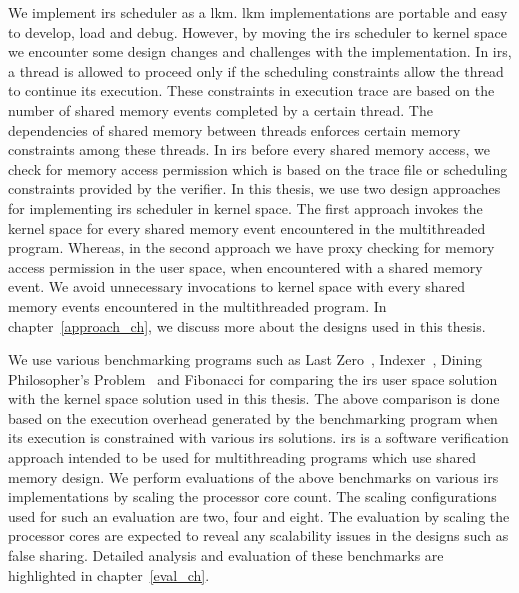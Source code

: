 We implement \acrshort{irs} scheduler as a \acrfull{lkm}. 
\acrshort{lkm} implementations are portable and easy to develop, load and debug. 
However, by moving the \acrshort{irs} scheduler to kernel space we encounter some design changes and challenges with the implementation. 
In \acrshort{irs}, a thread is allowed to proceed only if the scheduling constraints allow the thread to continue its execution. 
These constraints in execution trace are based on the number of shared memory events completed by a certain thread. 
The dependencies of shared memory between threads enforces certain memory constraints among these threads. 
In \acrshort{irs} before every shared memory access, we check for memory access permission which is based on the trace file or scheduling constraints provided by the verifier. 
In this thesis, we use two design approaches for implementing \acrshort{irs} scheduler in kernel space. 
The first approach invokes the kernel space for every shared memory event encountered in the multithreaded program. 
Whereas, in the second approach we have proxy checking for memory access permission in the user space, when encountered with a shared memory event. 
We avoid unnecessary invocations to kernel space with every shared memory events encountered in the multithreaded program. 
In chapter~\ref{approach_ch}, we discuss more about the designs used in this thesis. 

We use various benchmarking programs such as Last Zero~\citep{abdulla2014optimal}, Indexer~\citep{dynamic_por}, Dining Philosopher's Problem~\citep{silberschatz2014operating} and Fibonacci for comparing the \acrshort{irs} user space solution with the kernel space solution used in this thesis. 
The above comparison is done based on the execution overhead generated by the benchmarking program when its execution is constrained with various \acrshort{irs} solutions. 
\acrshort{irs} is a software verification approach intended to be used for multithreading programs which use shared memory design. 
We perform evaluations of the above benchmarks on various \acrshort{irs} implementations by scaling the processor core count. 
The scaling configurations used for such an evaluation are two, four and eight. 
The evaluation by scaling the processor cores are expected to reveal any scalability issues in the designs such as false sharing. 
Detailed analysis and evaluation of these benchmarks are highlighted in chapter~\ref{eval_ch}.